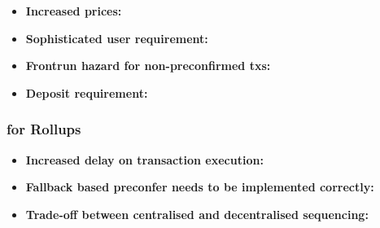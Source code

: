 \documentclass[a4paper]{article}
\theoremstyle{boldstyle}
\begin{document}
    \begin{itemize}
        \item \textbf{Increased prices:} %
        
        \item \textbf{Sophisticated user requirement:} %
        
        \item \textbf{Frontrun hazard for non-preconfirmed txs:} %
        
        \item \textbf{Deposit requirement:} %
    \end{itemize}
    
    \subsubsection{for Rollups}
    \begin{itemize}
        \item \textbf{Increased delay on transaction execution:} %
        
        \item \textbf{Fallback based preconfer needs to be implemented correctly:} %
        
        \item \textbf{Trade-off between centralised and decentralised sequencing:} %
    \end{itemize}
\end{document}
